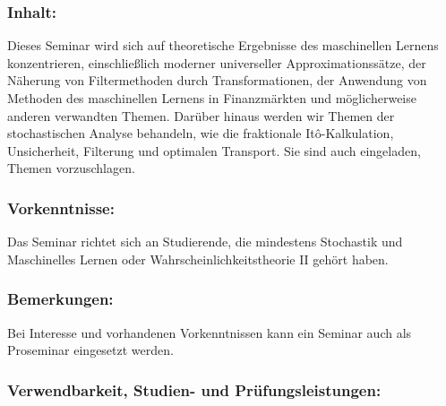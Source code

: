 \documentclass[a4paper,10pt]{article}
\begin{document}
\subsubsection*{\large
    Inhalt:
}
Dieses Seminar wird sich auf theoretische Ergebnisse des maschinellen Lernens konzentrieren, einschließlich moderner universeller Approximationssätze, der Näherung von Filtermethoden durch Transformationen, der Anwendung von Methoden des maschinellen Lernens in Finanzmärkten und möglicherweise anderen verwandten Themen. Darüber hinaus werden wir Themen der stochastischen Analyse behandeln, wie die fraktionale Itô-Kalkulation, Unsicherheit, Filterung und optimalen Transport. Sie sind auch eingeladen, Themen vorzuschlagen.
\subsubsection*{\large
    Vorkenntnisse:
}
Das Seminar richtet sich an Studierende, die mindestens Stochastik und Maschinelles Lernen oder Wahrscheinlichkeitstheorie II gehört haben.
\subsubsection*{\large
    Bemerkungen:
}
Bei Interesse und vorhandenen Vorkenntnissen kann ein Seminar auch als Proseminar eingesetzt werden.
\subsubsection*{\large
    Verwendbarkeit, Studien- und Prüfungsleistungen:
}
\end{document}
